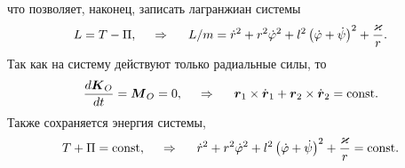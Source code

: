 что позволяет, наконец, записать лагранжиан системы
\begin{equation}
    L = T - \Pi,
    \hspace{0.5cm} \Rightarrow \hspace{0.5cm} 
    L / m =  \dot{r}^2 + r^2 \dot{\varphi}^2 + l^2 \left(\dot{\varphi}+ \dot{\psi}\right)^2 + \frac{\varkappa}{r} .
\end{equation}
Так как на систему действуют только радиальные силы, то
\begin{equation}
    \frac{d \mbox{\boldmath $K$}_O}{d t} = \mbox{\boldmath $M$}_O = 0, 
    \hspace{0.5cm} \Rightarrow \hspace{0.5cm} 
    \mbox{\boldmath $r$}_1 \times \dot{\mbox{\boldmath $r$}}_1 + \mbox{\boldmath $r$}_2 \times \dot{\mbox{\boldmath $r$}}_2 = \text{const}.
\end{equation}
Также сохраняется энергия системы,
\begin{equation}
    T + \Pi = \text{const}, 
    \hspace{0.5cm} \Rightarrow \hspace{0.5cm} 
     \dot{r}^2 + r^2 \dot{\varphi}^2 + l^2 \left(\dot{\varphi}+ \dot{\psi}\right)^2 + \frac{\varkappa}{r} = \text{const}.
\end{equation}